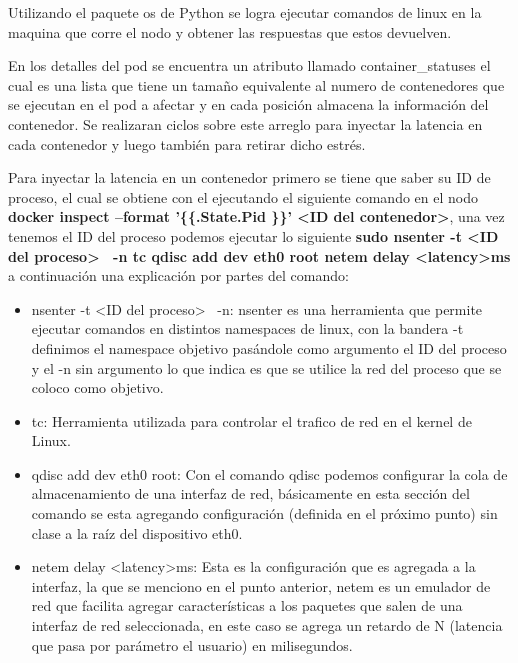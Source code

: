 \par Utilizando el paquete os de Python se logra ejecutar comandos de linux en la maquina que corre el nodo y obtener las respuestas que estos devuelven. \\

\par En los detalles del pod se encuentra un atributo llamado container\_statuses el cual es una lista que tiene un tamaño equivalente al numero de contenedores que se ejecutan en el pod a afectar y en cada posición almacena la información del contenedor. Se realizaran ciclos sobre este arreglo para inyectar la latencia en cada contenedor y luego también para retirar dicho estrés.\\

\par Para inyectar la latencia en un contenedor primero se tiene que saber su ID de proceso, el cual se obtiene con el ejecutando el siguiente comando en el nodo \textbf{docker inspect --format '\{\{.State.Pid \}\}' <ID del contenedor>}, una vez tenemos el ID del proceso podemos ejecutar lo siguiente \textbf{sudo nsenter -t <ID del proceso> \ -n tc qdisc add dev eth0 root netem delay <latency>ms} a continuación una explicación por partes del comando:

\begin{itemize}
        \item nsenter -t <ID del proceso> \ -n: nsenter es una herramienta que permite ejecutar comandos en distintos namespaces de linux, con la bandera -t definimos el namespace objetivo pasándole como argumento el ID del proceso y el -n sin argumento lo que indica es que se utilice la red del proceso que se coloco como objetivo.
        \item tc: Herramienta utilizada para controlar el trafico de red en el kernel de Linux.
        \item qdisc add dev eth0 root: Con el comando qdisc podemos configurar la cola de almacenamiento de una interfaz de red, básicamente en esta sección del comando se esta agregando configuración (definida en el próximo punto) sin clase a la raíz del dispositivo eth0.
        \item netem delay <latency>ms: Esta es la configuración que es agregada a la interfaz, la que se menciono en el punto anterior, netem es un emulador de red que facilita agregar características a los paquetes que salen de una interfaz de red seleccionada, en este caso se agrega un retardo de N (latencia que pasa por parámetro el usuario) en milisegundos.\\
    \end{itemize}
    

